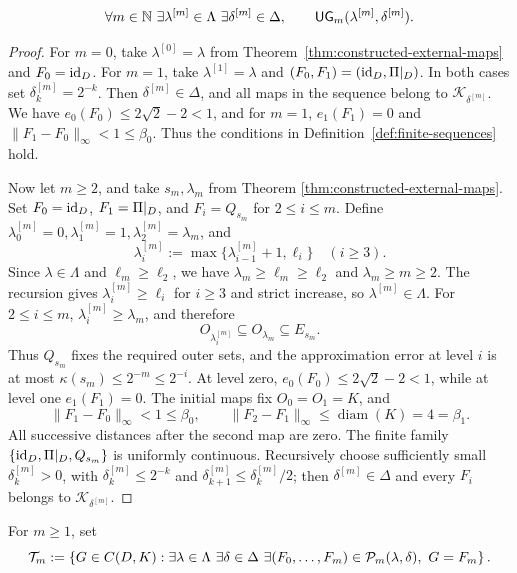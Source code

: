 \begin{proposition}
\label{prop:finite-sequences-exist}
\[
 \forall m\in\mathbb N\ \exists\lambda^{[m]}\in\Lambda\
 \exists\delta^{[m]}\in\Delta,\qquad
 \mathsf{UG}_m(\lambda^{[m]},\delta^{[m]}).
\]
\end{proposition}
\begin{proof}
For \(m=0\), take \(\lambda^{[0]}=\lambda\) from
Theorem~\ref{thm:constructed-external-maps} and \(F_0=\operatorname{id}_{D}\). For
\(m=1\), take \(\lambda^{[1]}=\lambda\) and
\((F_0,F_1)=(\operatorname{id}_{D},\Pi|_{D})\). In both cases set
\(\delta_k^{[m]}=2^{-k}\). Then \(\delta^{[m]}\in\Delta\), and all maps
in the sequence belong to \(\mathcal K_{\delta^{[m]}}\). We have
\(e_0(F_0)\le2\sqrt2-2<1\), and for \(m=1\),
\(e_1(F_1)=0\) and \(\|F_1-F_0\|_\infty<1\le\beta_0\). Thus the
conditions in Definition~\ref{def:finite-sequences} hold.

Now let \(m\ge2\), and take \(s_m,\lambda_m\) from Theorem
\ref{thm:constructed-external-maps}. Set \(F_0=\operatorname{id}_{D}\),
\(F_1=\Pi|_{D}\), and \(F_i=Q_{s_m}\) for \(2\le i\le m\). Define
\(\lambda^{[m]}_0=0,\lambda^{[m]}_1=1,
\lambda^{[m]}_2=\lambda_m\), and
\[
 \lambda^{[m]}_i:=
 \max\{\lambda^{[m]}_{i-1}+1,\ell_i\}\quad(i\ge3).
\]
Since \(\lambda\in\Lambda\) and \(\ell_m\ge\ell_2\), we have
\(\lambda_m\ge\ell_m\ge\ell_2\) and \(\lambda_m\ge m\ge2\). The
recursion gives \(\lambda^{[m]}_i\ge\ell_i\) for \(i\ge3\) and strict
increase, so \(\lambda^{[m]}\in\Lambda\). For \(2\le i\le m\),
\(\lambda^{[m]}_i\ge\lambda_m\), and therefore
\[
 O_{\lambda^{[m]}_i}\subseteq O_{\lambda_m}\subseteq E_{s_m}.
\]
Thus \(Q_{s_m}\) fixes the required outer sets, and the approximation
error at level \(i\) is at most
\(\kappa(s_m)\le2^{-m}\le2^{-i}\). At level zero,
\(e_0(F_0)\le2\sqrt2-2<1\), while at level one \(e_1(F_1)=0\). The
initial maps fix \(O_0=O_1=K\), and
\[
 \|F_1-F_0\|_\infty<1\le\beta_0,\qquad
 \|F_2-F_1\|_\infty\le\operatorname{diam}(K)=4=\beta_1.
\]
All successive distances after the second map are zero. The finite
family \(\{\operatorname{id}_{D},\Pi|_{D},Q_{s_m}\}\) is uniformly continuous.
Recursively choose sufficiently small \(\delta_k^{[m]}>0\), with
\(\delta_k^{[m]}\le2^{-k}\) and
\(\delta_{k+1}^{[m]}\le\delta_k^{[m]}/2\); then
\(\delta^{[m]}\in\Delta\) and every \(F_i\) belongs to
\(\mathcal K_{\delta^{[m]}}\).
\end{proof}

\begin{definition}
\label{def:last-maps}
For \(m\ge1\), set
\[
 \mathcal T_m:=
 \left\{G\in C(D,K):
  \exists\lambda\in\Lambda\ \exists\delta\in\Delta\
  \exists(F_0,\ldots,F_m)\in\mathcal P_m(\lambda,\delta),\
  G=F_m
 \right\}.
\]
\end{definition}

